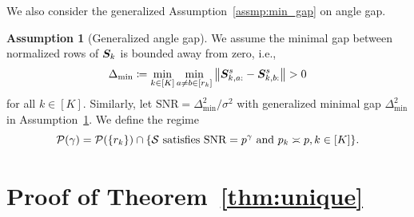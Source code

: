 \documentclass[lettersize,onecolumn,journal]{IEEEtran}
\theoremstyle{definition}
\theoremstyle{definition}
\newtheorem{assumption}{Assumption}
\newcommand{\of}[1]{\left(#1\right)}
\begin{document}
We also consider the generalized Assumption~\ref{assmp:min_gap} on angle gap.
\begin{assumption}[Generalized angle gap]\label{assmp:general_minimal_gap} We assume the minimal gap between normalized rows of $\bm S_k$ is bounded away from zero, i.e.,
\begin{equation}
     \Delta_{\min} \coloneqq \min_{k \in [K]} \min_{a \neq b \in [r_k]} \left\lVert \bm S_{k,a:}^s - \bm S_{k, b:}^s \right\rVert > 0
\end{equation}
for all $k \in [K]$. Similarly, let $\text{SNR} = \Delta_{\min}^2/\sigma^2$ with generalized minimal gap $\Delta_{\min}^2$ in Assumption~\ref{assmp:general_minimal_gap}. We define the regime
\begin{equation}
    \mathcal{P}(\gamma) = \mathcal{P} (\{r_k\}) \cap\{\mathcal{S} \text{ satisfies $\text{SNR} = p^{\gamma}$ and $p_k \asymp p, k \in [K]$} \}.
\end{equation}
\end{assumption}



\section*{Proof of Theorem~\ref{thm:unique}}
\end{document}
